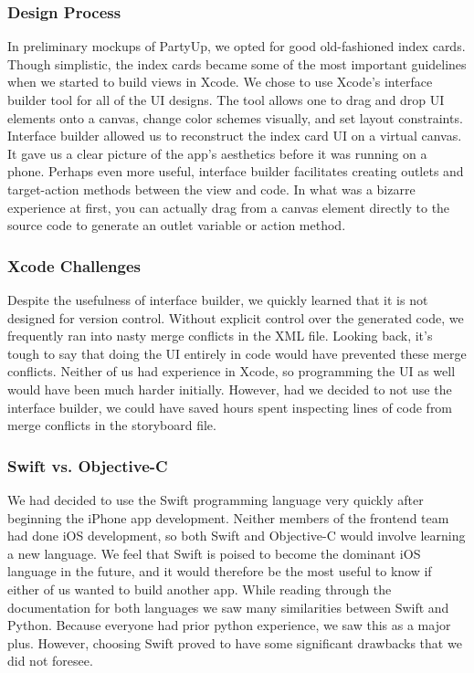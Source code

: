 \documentclass[12pt]{article}
\begin{document}
\subsubsection{Design Process}


In preliminary mockups of PartyUp, we opted for good old-fashioned index cards. Though simplistic, the index cards became some of the most important guidelines when we started to build views in Xcode.
We chose to use Xcode's interface builder tool for all of the UI designs. The tool allows one to drag and drop UI elements onto a canvas, change color schemes visually, and set layout constraints.
Interface builder allowed us to reconstruct the index card UI on a virtual canvas. It gave us a clear picture of the app's aesthetics before it was running on a phone. 
Perhaps even more useful, interface builder facilitates creating outlets and target-action methods between the view and code. 
In what was a bizarre experience at first, you can actually drag from a canvas element directly to the source code to generate an outlet variable or action method. 

\subsubsection{Xcode Challenges}

Despite the usefulness of interface builder, we quickly learned that it is not designed for version control.
Without explicit control over the generated code, we frequently ran into nasty merge conflicts in the XML file.
Looking back, it's tough to say that doing the UI entirely in code would have prevented these merge conflicts. 
Neither of us had experience in Xcode, so programming the UI as well would have been much harder initially. 
However, had we decided to not use the interface builder, we could have saved hours spent inspecting lines of code from merge conflicts in the storyboard file. 

\subsubsection{Swift vs. Objective-C}

We had decided to use the Swift programming language very quickly after beginning the iPhone app development.
Neither members of the frontend team had done iOS development, so both Swift and Objective-C would involve learning a new language. 
We feel that Swift is poised to become the dominant iOS language in the future, and it would therefore be the most useful to know if either of us wanted to build another app. 
While reading through the documentation for both languages we saw many similarities between Swift and Python. 
Because everyone had prior python experience, we saw this as a major plus. 
However, choosing Swift proved to have some significant drawbacks that we did not foresee. 
\end{document}
